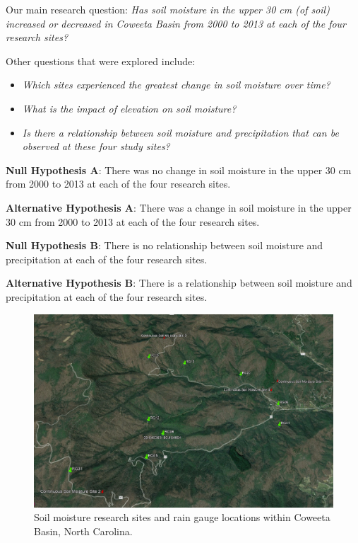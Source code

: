 \documentclass[
  12pt,
]{article}
\providecommand{\tightlist}{%
  \setlength{\itemsep}{0pt}\setlength{\parskip}{0pt}}
\begin{document}
Our main research question: \emph{Has soil moisture in the upper 30 cm
(of soil) increased or decreased in Coweeta Basin from 2000 to 2013 at
each of the four research sites?}

Other questions that were explored include:

\begin{itemize}
\tightlist
\item
  \emph{Which sites experienced the greatest change in soil moisture
  over time?}
\item
  \emph{What is the impact of elevation on soil moisture?}
\item
  \emph{Is there a relationship between soil moisture and precipitation
  that can be observed at these four study sites?}
\end{itemize}

\textbf{Null Hypothesis A}: There was no change in soil moisture in the
upper 30 cm from 2000 to 2013 at each of the four research sites.

\textbf{Alternative Hypothesis A}: There was a change in soil moisture
in the upper 30 cm from 2000 to 2013 at each of the four research sites.

\textbf{Null Hypothesis B}: There is no relationship between soil
moisture and precipitation at each of the four research sites.

\textbf{Alternative Hypothesis B}: There is a relationship between soil
moisture and precipitation at each of the four research sites.

\begin{figure}
\centering
\includegraphics{../Data/precipandsmois.png}
\caption{Soil moisture research sites and rain gauge locations within
Coweeta Basin, North Carolina.}
\end{figure}
\end{document}
